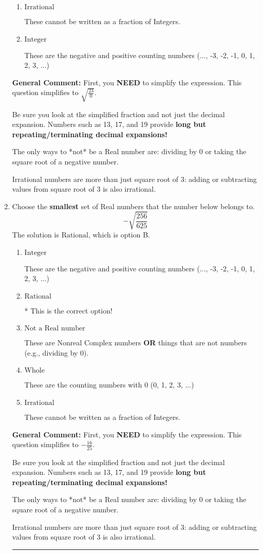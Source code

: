\documentclass{extbook}[14pt]
\newcommand{\litem}[1]{\item #1

\rule{\textwidth}{0.4pt}}
\begin{document}
\begin{enumerate}
{\begin{enumerate}[label=\Alph*.]
These are numbers that can be written as fraction of Integers (e.g., -2/3)
\item \( \text{Irrational} \)

These cannot be written as a fraction of Integers.
\item \( \text{Integer} \)

These are the negative and positive counting numbers (..., -3, -2, -1, 0, 1, 2, 3, ...)
\end{enumerate}

\textbf{General Comment:} First, you \textbf{NEED} to simplify the expression. This question simplifies to $\sqrt{\frac{23}{0}}$. 
 
 Be sure you look at the simplified fraction and not just the decimal expansion. Numbers such as 13, 17, and 19 provide \textbf{long but repeating/terminating decimal expansions!} 
 
 The only ways to *not* be a Real number are: dividing by 0 or taking the square root of a negative number. 
 
 Irrational numbers are more than just square root of 3: adding or subtracting values from square root of 3 is also irrational.
}
\litem{
Choose the \textbf{smallest} set of Real numbers that the number below belongs to.
\[ -\sqrt{\frac{256}{625}} \]The solution is \( \text{Rational} \), which is option B.\begin{enumerate}[label=\Alph*.]
\item \( \text{Integer} \)

These are the negative and positive counting numbers (..., -3, -2, -1, 0, 1, 2, 3, ...)
\item \( \text{Rational} \)

* This is the correct option!
\item \( \text{Not a Real number} \)

These are Nonreal Complex numbers \textbf{OR} things that are not numbers (e.g., dividing by 0).
\item \( \text{Whole} \)

These are the counting numbers with 0 (0, 1, 2, 3, ...)
\item \( \text{Irrational} \)

These cannot be written as a fraction of Integers.
\end{enumerate}

\textbf{General Comment:} First, you \textbf{NEED} to simplify the expression. This question simplifies to $-\frac{16}{25}$. 
 
 Be sure you look at the simplified fraction and not just the decimal expansion. Numbers such as 13, 17, and 19 provide \textbf{long but repeating/terminating decimal expansions!} 
 
 The only ways to *not* be a Real number are: dividing by 0 or taking the square root of a negative number. 
 
 Irrational numbers are more than just square root of 3: adding or subtracting values from square root of 3 is also irrational.
}
\end{enumerate}
\end{document}
